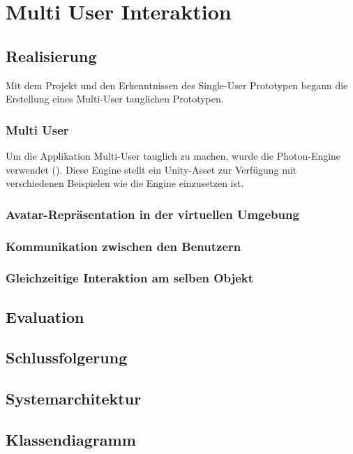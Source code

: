 \chapter{Multi User Interaktion}
\label{ch:Multi_User_Interaktion}

\section{Realisierung}
Mit dem Projekt und den Erkenntnissen des Single-User Prototypen begann die Erstellung eines Multi-User tauglichen Prototypen.

\subsection{Multi User}
Um die Applikation Multi-User tauglich zu machen, wurde die Photon-Engine verwendet (\cite{noauthor_photon_2019}). Diese Engine stellt ein Unity-Asset zur Verfügung mit verschiedenen Beispielen wie die Engine einzusetzen ist.


\subsection{Avatar-Repräsentation in der virtuellen Umgebung}

\subsection{Kommunikation zwischen den Benutzern}


\subsection{Gleichzeitige Interaktion am selben Objekt}

\section{Evaluation}

\section{Schlussfolgerung}

\section{Systemarchitektur}

\section{Klassendiagramm}